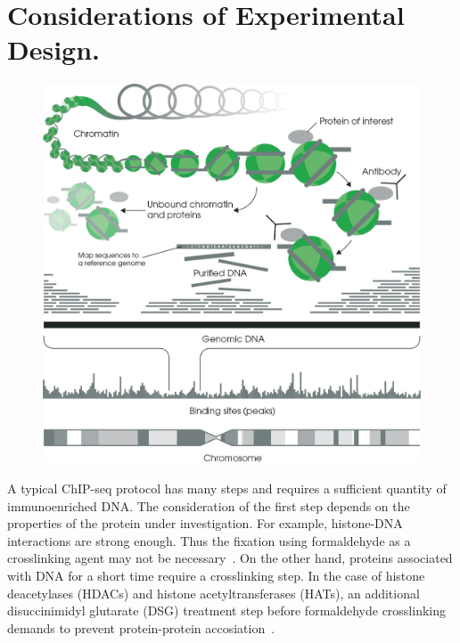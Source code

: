 





\section{Considerations of Experimental Design.}

\begin{figure}[b!]
    \centering
    \includegraphics[width=\textwidth]{../img/chip.jpeg}
    \label{fig:graph_classes}
\end{figure}

A typical ChIP-seq protocol has many steps and requires a sufficient quantity of immunoenriched DNA. 
The consideration of the first step depends on the properties of the protein under investigation. 
For example, histone-DNA interactions are strong enough. 
Thus the fixation using formaldehyde as a crosslinking agent may not be necessary~\cite{barski2008identification}. 
On the other hand, proteins associated with DNA for a short time require a crosslinking step. 
In the case of histone deacetylases (HDACs) and histone acetyltransferases (HATs), an additional disuccinimidyl glutarate (DSG) treatment step before formaldehyde crosslinking demands to prevent protein-protein accosiation~\cite{wang2009genome}. 


